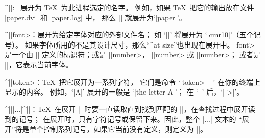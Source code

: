 {{{{{{{{%
\smallbreak
\textindent\bull ^|\jobname|: \ 展开为 \TeX\ 为此进程选定的名字。%
例如，如果 \TeX\ 把它的输出放在文件 |paper.dvi| 和 |paper.log| 中，
那么 |\jobname| 就展开为`|paper|'。

\smallbreak
\textindent\bull ^|\fontname|\<font>：展开为给定字体对应的外部文件名；
如 `|\fontname\tenrm|' 将展开为 `|cmr10|'（五个记号）。
如果字体所用的不是其设计尺寸，那么``^{at size}''也出现在展开中。
\<font> 是一个由 |\font| 定义的标识符；或是 |\textfont|\<number>，
|\scriptfont|\<number> 或 |\scriptscriptfont|\<number>；
或者是 |\font|，它表示当前字体。

\smallbreak
\textindent\bull ^|\meaning|\<token>：\TeX\ 把它展开为一系列字符，
它们是命令 `|\let\test= |\<token> |\show\test|' 在你的终端上显示的内容。
例如，`|\meaning A|' 展开的一般是 `|the letter A|'；
在 `|\def\A#1B{\C}|' 后，`|\meaning\A|' 展开的是 `|macro:#1B->\C |'。

\smallbreak
\textindent\bull ^|\csname||...|^|\endcsname|：\TeX\ 在展开 |\csname|
时要一直读取直到找到匹配的 |\endcsname|，在查找过程中展开读到的记号；
在展开时，只有字符记号或保留下来。因此，整个 |\csname...\endcsname| 文本的
``展开''将是单个控制系列记号，如果它当前没有定义，则定义为 |\relax|。

}}}}}}}}
